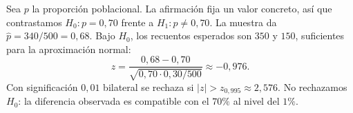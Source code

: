 Sea $p$ la proporción poblacional. La afirmación fija un valor concreto, así que contrastamos $H_0:p=0{,}70$ frente a $H_1:p\ne0{,}70$. La muestra da $\hat p=340/500=0{,}68$. Bajo $H_0$, los recuentos esperados son $350$ y $150$, suficientes para la aproximación normal:
\[
z=\frac{0{,}68-0{,}70}{\sqrt{0{,}70\cdot0{,}30/500}}\approx-0{,}976.
\]
Con significación $0{,}01$ bilateral se rechaza si $|z|>z_{0{,}995}\approx2{,}576$. No rechazamos $H_0$: la diferencia observada es compatible con el $70\%$ al nivel del $1\%$.
